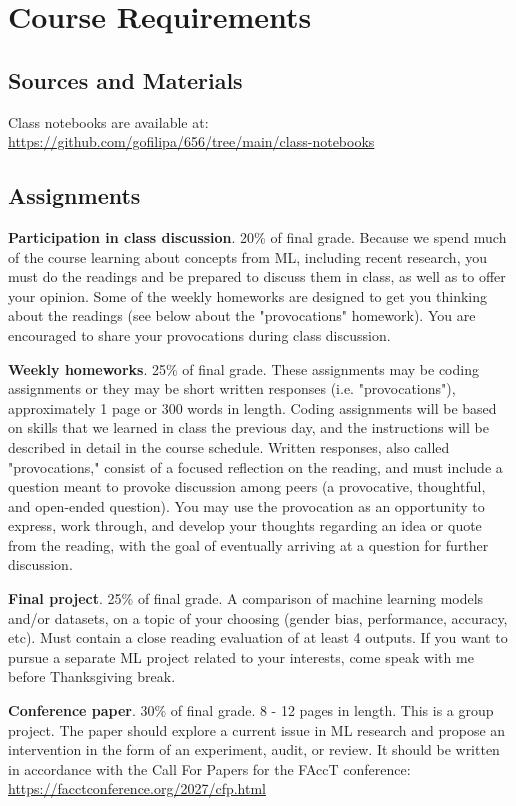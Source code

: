 \documentclass[12pt]{article}
\begin{document}
\section*{Course Requirements}
\label{sec:orgf6f7eda}
\subsection*{Sources and Materials}
\label{sec:orgf3769b1}
Class notebooks are available at:
\url{https://github.com/gofilipa/656/tree/main/class-notebooks}

\subsection*{Assignments}
\label{sec:org517861a}
\textbf{Participation in class discussion}. 20\% of final grade. Because we
spend much of the course learning about concepts from ML, including
recent research, you must do the readings and be prepared to discuss
them in class, as well as to offer your opinion. Some of the weekly
homeworks are designed to get you thinking about the readings (see
below about the "provocations" homework). You are encouraged to share
your provocations during class discussion.

\textbf{Weekly homeworks}. 25\% of final grade. These assignments may be
coding assignments or they may be short written responses (i.e.
"provocations"), approximately 1 page or 300 words in length. Coding
assignments will be based on skills that we learned in class the
previous day, and the instructions will be described in detail in the
course schedule. Written responses, also called "provocations,"
consist of a focused reflection on the reading, and must include a
question meant to provoke discussion among peers (a provocative,
thoughtful, and open-ended question). You may use the provocation as
an opportunity to express, work through, and develop your thoughts
regarding an idea or quote from the reading, with the goal of
eventually arriving at a question for further discussion.

\textbf{Final project}. 25\% of final grade. A comparison of machine learning
models and/or datasets, on a topic of your choosing (gender bias,
performance, accuracy, etc). Must contain a close reading evaluation
of at least 4 outputs. If you want to pursue a separate ML project
related to your interests, come speak with me before Thanksgiving
break.

\textbf{Conference paper}. 30\% of final grade. 8 - 12 pages in length. This
is a group project. The paper should explore a current issue in ML
research and propose an intervention in the form of an experiment,
audit, or review. It should be written in accordance with the Call For
Papers for the FAccT conference:
\url{https://facctconference.org/2027/cfp.html}
\end{document}
